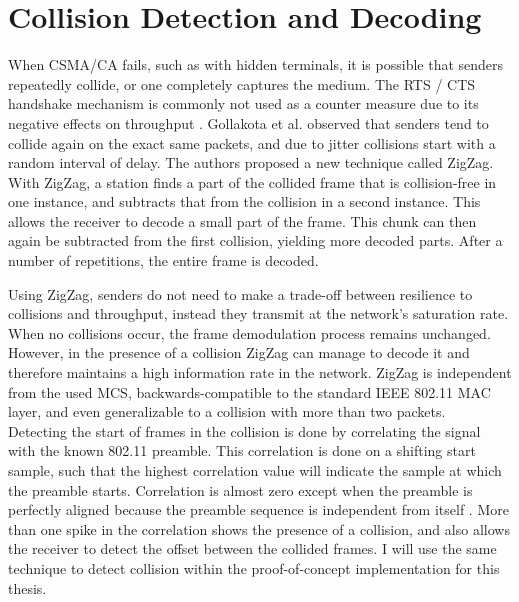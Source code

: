 
\section{Collision Detection and Decoding}

When \gls{CSMA/CA} fails, such as with hidden terminals, it is possible that senders repeatedly collide, or one completely captures the medium. The \gls{RTS} / \gls{CTS} handshake mechanism is commonly not used as a counter measure due to its negative effects on throughput \cite{bianchi2000, gollakota2008, choi2013}. Gollakota et al. observed that senders tend to collide again on the exact same packets, and due to jitter collisions start with a random interval of delay. The authors proposed a new technique called ZigZag. With ZigZag, a station finds a part of the collided frame that is collision-free in one instance, and subtracts that from the collision in a second instance. This allows the receiver to decode a small part of the frame. This chunk can then again be subtracted from the first collision, yielding more decoded parts. After a number of repetitions, the entire frame is decoded.

Using ZigZag, senders do not need to make a trade-off between resilience to collisions and throughput, instead they transmit at the network's saturation rate. When no collisions occur, the frame demodulation process remains unchanged. However, in the presence of a collision ZigZag can manage to decode it and therefore maintains a high information rate in the network. ZigZag is independent from the used \gls{MCS}, backwards-compatible to the standard IEEE 802.11 \gls{MAC} layer, and even generalizable to a collision with more than two packets.\\

Detecting the start of frames in the collision is done by correlating the signal with the known 802.11 preamble. This correlation is done on a shifting start sample, such that the highest correlation value will indicate the sample at which the preamble starts. Correlation is almost zero except when the preamble is perfectly aligned because the preamble sequence is independent from itself \cite{ieee2012}. More than one spike in the correlation shows the presence of a collision, and also allows the receiver to detect the offset between the collided frames. I will use the same technique to detect collision within the proof-of-concept implementation for this thesis.\\

